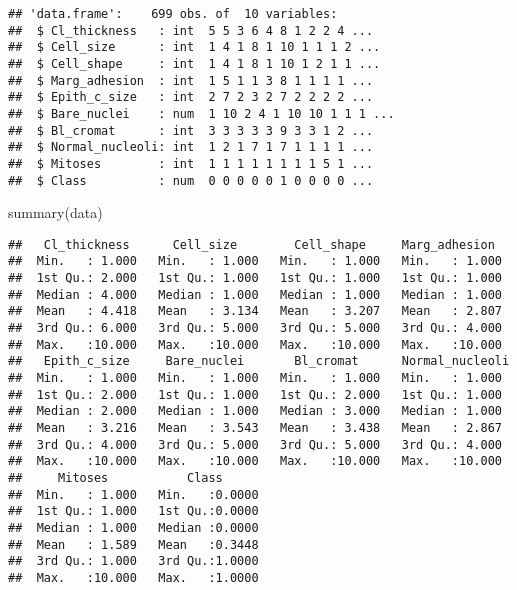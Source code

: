 \documentclass[
]{article}
\newenvironment{Shaded}{\begin{snugshade}}{\end{snugshade}}
\newcommand{\ConstantTok}[1]{\textcolor[rgb]{0.00,0.00,0.00}{#1}}
\newcommand{\FunctionTok}[1]{\textcolor[rgb]{0.00,0.00,0.00}{#1}}
\newcommand{\NormalTok}[1]{#1}
\newcommand{\OtherTok}[1]{\textcolor[rgb]{0.56,0.35,0.01}{#1}}
\newcommand{\SpecialCharTok}[1]{\textcolor[rgb]{0.00,0.00,0.00}{#1}}
\begin{document}
\begin{Shaded}
\end{Shaded}

\begin{verbatim}
## 'data.frame':    699 obs. of  10 variables:
##  $ Cl_thickness   : int  5 5 3 6 4 8 1 2 2 4 ...
##  $ Cell_size      : int  1 4 1 8 1 10 1 1 1 2 ...
##  $ Cell_shape     : int  1 4 1 8 1 10 1 2 1 1 ...
##  $ Marg_adhesion  : int  1 5 1 1 3 8 1 1 1 1 ...
##  $ Epith_c_size   : int  2 7 2 3 2 7 2 2 2 2 ...
##  $ Bare_nuclei    : num  1 10 2 4 1 10 10 1 1 1 ...
##  $ Bl_cromat      : int  3 3 3 3 3 9 3 3 1 2 ...
##  $ Normal_nucleoli: int  1 2 1 7 1 7 1 1 1 1 ...
##  $ Mitoses        : int  1 1 1 1 1 1 1 1 5 1 ...
##  $ Class          : num  0 0 0 0 0 1 0 0 0 0 ...
\end{verbatim}

\begin{Shaded}
\begin{Highlighting}[]
\FunctionTok{summary}\NormalTok{(data)}
\end{Highlighting}
\end{Shaded}

\begin{verbatim}
##   Cl_thickness      Cell_size        Cell_shape     Marg_adhesion   
##  Min.   : 1.000   Min.   : 1.000   Min.   : 1.000   Min.   : 1.000  
##  1st Qu.: 2.000   1st Qu.: 1.000   1st Qu.: 1.000   1st Qu.: 1.000  
##  Median : 4.000   Median : 1.000   Median : 1.000   Median : 1.000  
##  Mean   : 4.418   Mean   : 3.134   Mean   : 3.207   Mean   : 2.807  
##  3rd Qu.: 6.000   3rd Qu.: 5.000   3rd Qu.: 5.000   3rd Qu.: 4.000  
##  Max.   :10.000   Max.   :10.000   Max.   :10.000   Max.   :10.000  
##   Epith_c_size     Bare_nuclei       Bl_cromat      Normal_nucleoli 
##  Min.   : 1.000   Min.   : 1.000   Min.   : 1.000   Min.   : 1.000  
##  1st Qu.: 2.000   1st Qu.: 1.000   1st Qu.: 2.000   1st Qu.: 1.000  
##  Median : 2.000   Median : 1.000   Median : 3.000   Median : 1.000  
##  Mean   : 3.216   Mean   : 3.543   Mean   : 3.438   Mean   : 2.867  
##  3rd Qu.: 4.000   3rd Qu.: 5.000   3rd Qu.: 5.000   3rd Qu.: 4.000  
##  Max.   :10.000   Max.   :10.000   Max.   :10.000   Max.   :10.000  
##     Mitoses           Class       
##  Min.   : 1.000   Min.   :0.0000  
##  1st Qu.: 1.000   1st Qu.:0.0000  
##  Median : 1.000   Median :0.0000  
##  Mean   : 1.589   Mean   :0.3448  
##  3rd Qu.: 1.000   3rd Qu.:1.0000  
##  Max.   :10.000   Max.   :1.0000
\end{verbatim}
\end{document}
